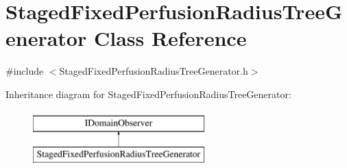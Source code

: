 \hypertarget{class_staged_fixed_perfusion_radius_tree_generator}{}\section{Staged\+Fixed\+Perfusion\+Radius\+Tree\+Generator Class Reference}
\label{class_staged_fixed_perfusion_radius_tree_generator}


{\ttfamily \#include $<$Staged\+Fixed\+Perfusion\+Radius\+Tree\+Generator.\+h$>$}

Inheritance diagram for Staged\+Fixed\+Perfusion\+Radius\+Tree\+Generator\+:\begin{figure}[H]
\begin{center}
\leavevmode
\includegraphics[height=2.000000cm]{d1/d25/class_staged_fixed_perfusion_radius_tree_generator}
\end{center}
\end{figure}
